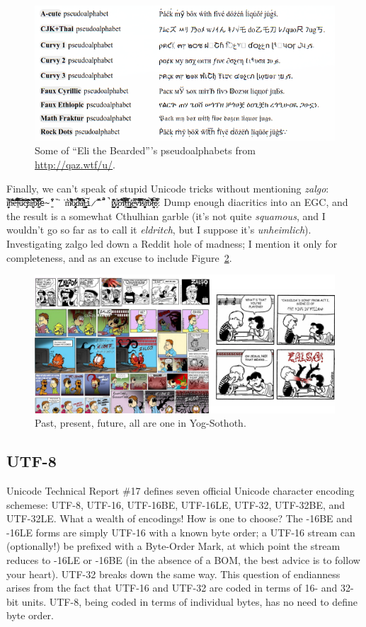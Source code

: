 \begin{figure}[!htb]
    \centering
    \includegraphics[width=.75\linewidth]{media/pseudoalphabets.png}
    \caption{Some of ``Eli the Bearded'''s pseudoalphabets from \url{http://qaz.wtf/u/}.}
    \label{fig:pseudoalphabets}
\end{figure}

Finally, we can't speak of stupid Unicode tricks without mentioning
\textit{zalgo}: \texttt{i̸̬̦͙̒̌̓͝n̴͛̓͋̈́͂̇̑̅̕e̵̎̈́̎̀̐̓͆͘͝l̴̠͛͂̃́̅̄̚͝u̷̾́̄̇́̎͂̚͝c̴̡̟̜̉̈́̋͂̈́̎t̵́͊̂̑̑̇̒̃̄å̵̰͎̫̅̿̏͂̽b̷̛͋̎́͛́͋̈͌l̷̰͎̫͐̑̈͛͆͝e̴̱̋̾̃̒̏͘͘̕m̸̆͋͌̍̉͆͌͛̓ȍ̷̡̜̭͙̞̣̎̚d̴̐̃͆̈́̽̔̐̀͝ä̸́̑̐̒͊̔̾́̕l̶̨̡̙̳̭̮̠̼͝i̷̋̆̌̿̎̃̋̚̚ṯ̷̱̫̺͗͒̔͆̄ẏ̷̡̛̮͈͑̓́͊ȏ̵͋̅́̋͒̐̇͝f̸̛̃͐͒̈̾̆̕͠t̶͈̱̠͋̑̊̿̇͘h̷̰͚̳̳̤͗̓͗̄e̴͇͙̜̿͐́̎̌͘ṽ̶̌̈́́́̈́͌͂͘i̷̛͊̒̏̄̀̅͠͝s̸̯̘͍̝͓̈́ͅͅì̵̃͊̇͗̄̋̇͘b̷̃̎̓͛̊̾͘̚̚l̶̯̼͎͉̎͛̆͠e̷̙͊̇̿͗̃͊̓́}. Dump enough
diacritics into an EGC, and the result is a somewhat Cthulhian garble (it's not
quite \textit{squamous}, and I wouldn't go so far as to call it
\textit{eldritch}, but I suppose it's \textit{unheimlich}). Investigating zalgo
led down a Reddit hole of madness; I mention it only for completeness, and as
an excuse to include Figure~\ref{fig:zalgo}.

\begin{figure}[H]
    \centering
    \includegraphics[width=.5\linewidth]{media/zalgo.png}
    \caption{Past, present, future, all are one in Yog-Sothoth.}
    \label{fig:zalgo}
\end{figure}

\subsection{UTF-8}
Unicode Technical Report \#17\cite{annex17} defines seven official Unicode
character encoding schemese: UTF-8, UTF-16, UTF-16BE, UTF-16LE, UTF-32, UTF-32BE,
and UTF-32LE. What a wealth of encodings! How is one to choose? The -16BE and
-16LE forms are simply UTF-16 with a known byte order; a UTF-16 stream can
(optionally!) be prefixed with a Byte-Order Mark, at which point the stream
reduces to -16LE or -16BE (in the absence of a BOM, the best advice is to follow
your heart). UTF-32 breaks down the same way. This question of endianness arises
from the fact that UTF-16 and UTF-32 are coded in terms of 16- and 32-bit units.
UTF-8, being coded in terms of individual bytes, has no need to define byte order.

